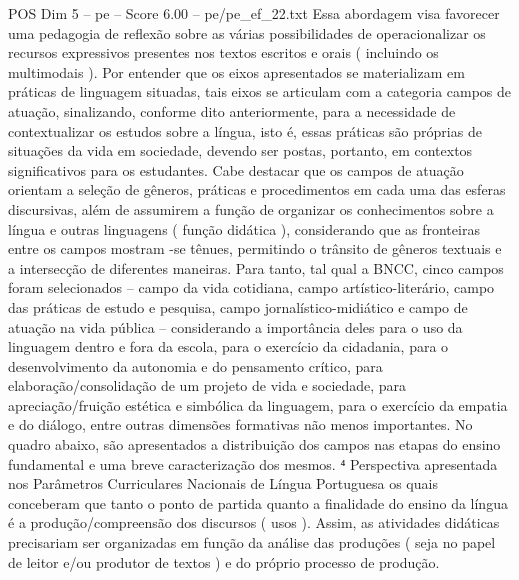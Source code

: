\begin{textsample}{POS Dim 5 – pe – Score 6.00 – pe/pe\_ef\_22.txt}
Essa abordagem visa favorecer uma pedagogia de reflexão sobre as várias possibilidades de operacionalizar os recursos expressivos presentes nos textos escritos e orais ( incluindo os multimodais ).
Por entender que os eixos apresentados se materializam em práticas de linguagem situadas, tais eixos se articulam com a categoria campos de atuação, sinalizando, conforme dito anteriormente, para a necessidade de contextualizar os estudos sobre a língua, isto é, essas práticas são próprias de situações da vida em sociedade, devendo ser postas, portanto, em contextos significativos para os estudantes.
Cabe destacar que os campos de atuação orientam a seleção de gêneros, práticas e procedimentos em cada uma das esferas discursivas, além de assumirem a função de organizar os conhecimentos sobre a língua e outras linguagens ( função didática ), considerando que as fronteiras entre os campos mostram -se tênues, permitindo o trânsito de gêneros textuais e a intersecção de diferentes maneiras.
Para tanto, tal qual a BNCC, cinco campos foram selecionados – campo da vida cotidiana, campo artístico-literário, campo das práticas de estudo e pesquisa, campo jornalístico-midiático e campo de atuação na vida pública – considerando a importância deles para o uso da linguagem dentro e fora da escola, para o exercício da cidadania, para o desenvolvimento da autonomia e do pensamento crítico, para elaboração/consolidação de um projeto de vida e sociedade, para apreciação/fruição estética e simbólica da linguagem, para o exercício da empatia e do diálogo, entre outras dimensões formativas não menos importantes.
No quadro abaixo, são apresentados a distribuição dos campos nas etapas do ensino fundamental e uma breve caracterização dos mesmos. ⁴ Perspectiva apresentada nos Parâmetros Curriculares Nacionais de Língua Portuguesa os quais conceberam que tanto o ponto de partida quanto a finalidade do ensino da língua é a produção/compreensão dos discursos ( usos ).
Assim, as atividades didáticas precisariam ser organizadas em função da análise das produções ( seja no papel de leitor e/ou produtor de textos ) e do próprio processo de produção.

\end{textsample}
